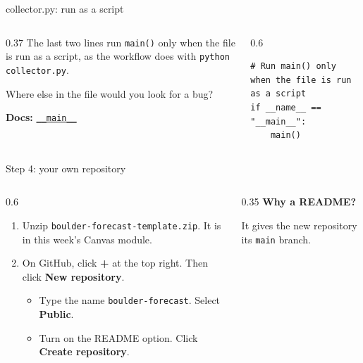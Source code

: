 \documentclass[9pt,aspectratio=169]{beamer}
\begin{document}
\begin{frame}[fragile]{collector.py: run as a script}
    \begin{columns}[T]
        \begin{column}{0.37\textwidth}
            The last two lines run \texttt{main()} only when the file is run as a script, as the workflow does with \texttt{python collector.py}.

            \medskip
            Where else in the file would you look for a bug?

            \medskip
            {\scriptsize\textbf{Docs:} \href{https://docs.python.org/3/library/__main__.html\#idiomatic-usage}{\texttt{\_\_main\_\_}}\par}
        \end{column}
        \begin{column}{0.6\textwidth}
\begin{lstlisting}
# Run main() only when the file is run as a script
if __name__ == "__main__":
    main()
\end{lstlisting}
        \end{column}
    \end{columns}
\end{frame}

\begin{frame}{Step 4: your own repository}
    \begin{columns}[T]
        \begin{column}{0.6\textwidth}
            \begin{enumerate}\small
                \item Unzip \texttt{boulder-forecast-template.zip}. It is in this week's Canvas module.
                \item On GitHub, click \textbf{+} at the top right. Then click \textbf{New repository}.
                \begin{itemize}\small
                    \item Type the name \texttt{boulder-forecast}. Select \textbf{Public}.
                    \item Turn on the README option. Click \textbf{Create repository}.
                \end{itemize}
            \end{enumerate}
        \end{column}
        \begin{column}{0.35\textwidth}
            \textbf{Why a README?}\\[2pt]
            {\footnotesize It gives the new repository its \texttt{main} branch.\par}
        \end{column}
    \end{columns}
\end{frame}
\end{document}
